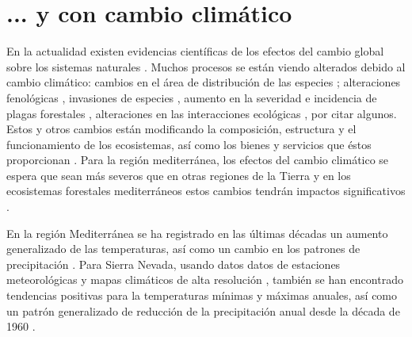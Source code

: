 \section{... y con cambio climático}\label{sec:intro:climate-change}

En la actualidad existen evidencias científicas de los efectos del cambio global sobre los sistemas naturales \autocites{IPCC2013ClimateChange}. Muchos procesos se están viendo alterados debido al cambio climático: cambios en el área de distribución de las especies \autocites{Thuilleretal2005ClimateChange}; alteraciones fenológicas \autocites{GordoSanz2005PhenologyClimate, EstiartePenuelas2015AlterationPhenology}, invasiones de especies \autocite{GonzalezMorenoetal2014PlantInvasions}, aumento en la severidad e incidencia de plagas forestales \autocites{Hodaretal2012CambioClimatico,HodarZamora2004HerbivoryClimatic}, alteraciones en las interacciones ecológicas \autocites{MontoyaRaffaelli2010ClimateChange}, por citar algunos. Estos y otros cambios están modificando la composición, estructura y el funcionamiento de los ecosistemas, así como los bienes y servicios que éstos proporcionan \autocites{Dingetal2016ValuingClimate}. Para la región mediterránea, los efectos del cambio climático se espera que sean más severos que en otras regiones de la Tierra \autocites{Giorgi2006ClimateChange,IPCC2013ClimateChange} y en los ecosistemas forestales mediterráneos estos cambios tendrán impactos significativos \autocites{Regato2008AdaptingGlobal,RescodeDiosetal2006ClimateChange,Penuelasetal2017ImpactsGlobal,HerreroZavala2015BosquesBiodiversidad}.  

En la región Mediterránea se ha registrado en las últimas décadas un aumento generalizado de las temperaturas, así como un cambio en los patrones de precipitación \autocites{PerezBoscolo2010ClimateSpain,GiorgiLionello2008ClimateChange,Crameretal2020ClimateEnvironmental}. Para Sierra Nevada, usando datos datos de estaciones meteorológicas y mapas climáticos de alta resolución \autocites{Benitoetal2012SimulacionesClimaticas}, también se han encontrado tendencias positivas para la temperaturas mínimas y máximas anuales, así como un patrón generalizado de reducción de la precipitación anual desde la década de 1960 \autocites{PerezLuqueetal2016SenalesCambio,PerezLuqueetal2021ClimaNevadaBase}.  

